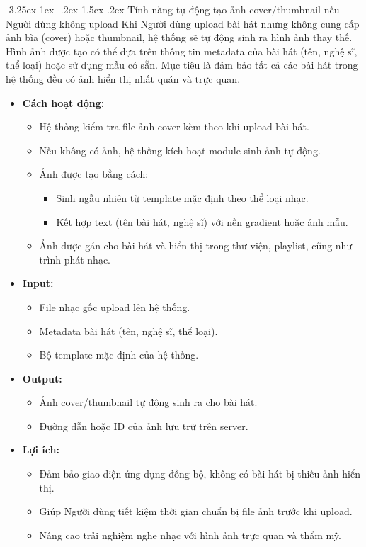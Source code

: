 \documentclass[a4paper]{article}
\makeatletter
\newcommand{\cach}{\hspace*{1.5em}\ignorespaces}
\newcounter {subsubsubsection}[subsubsection]
\newcommand\subsubsubsection{\@startsection{subsubsubsection}{4}{\z@}%
                                     {-3.25ex\@plus -1ex \@minus -.2ex}%
                                     {1.5ex \@plus .2ex}%
                                     {\normalfont\normalsize\bfseries}}
\makeatother
\begin{document}
\subsubsubsection{Tính năng tự động tạo ảnh cover/thumbnail nếu Người dùng không upload}
\cach Khi Người dùng upload bài hát nhưng không cung cấp ảnh bìa (cover) hoặc thumbnail, hệ thống sẽ tự động sinh ra hình ảnh thay thế.
Hình ảnh được tạo có thể dựa trên thông tin metadata của bài hát (tên, nghệ sĩ, thể loại) hoặc sử dụng mẫu có sẵn.
Mục tiêu là đảm bảo tất cả các bài hát trong hệ thống đều có ảnh hiển thị nhất quán và trực quan.

\begin{itemize}
	\item \textbf{Cách hoạt động:}
	      \begin{itemize}
		      \item Hệ thống kiểm tra file ảnh cover kèm theo khi upload bài hát.
		      \item Nếu không có ảnh, hệ thống kích hoạt module sinh ảnh tự động.
		      \item Ảnh được tạo bằng cách:
		            \begin{itemize}
			            \item Sinh ngẫu nhiên từ template mặc định theo thể loại nhạc.
			            \item Kết hợp text (tên bài hát, nghệ sĩ) với nền gradient hoặc ảnh mẫu.
		            \end{itemize}
		      \item Ảnh được gán cho bài hát và hiển thị trong thư viện, playlist, cũng như trình phát nhạc.
	      \end{itemize}

	\item \textbf{Input:}
	      \begin{itemize}
		      \item File nhạc gốc upload lên hệ thống.
		      \item Metadata bài hát (tên, nghệ sĩ, thể loại).
		      \item Bộ template mặc định của hệ thống.
	      \end{itemize}

	\item \textbf{Output:}
	      \begin{itemize}
		      \item Ảnh cover/thumbnail tự động sinh ra cho bài hát.
		      \item Đường dẫn hoặc ID của ảnh lưu trữ trên server.
	      \end{itemize}


	\item \textbf{Lợi ích:}
	      \begin{itemize}
		      \item Đảm bảo giao diện ứng dụng đồng bộ, không có bài hát bị thiếu ảnh hiển thị.
		      \item Giúp Người dùng tiết kiệm thời gian chuẩn bị file ảnh trước khi upload.
		      \item Nâng cao trải nghiệm nghe nhạc với hình ảnh trực quan và thẩm mỹ.
	      \end{itemize}
\end{itemize}
\end{document}
